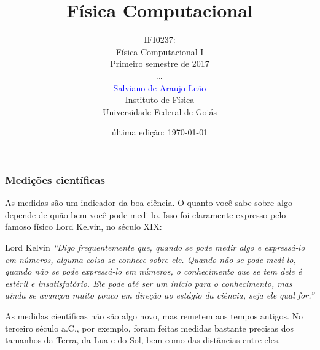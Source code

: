 \documentclass[xcolor=dvipsnames,compress,aspectratio=169,10pt]{beamer}
\title
  [Física Computacional]
  {Física Computacional}
\author[Salviano A. Leão]
{
    IFI0237:\\
    Física Computacional I\\
    Primeiro semestre de 2017\\ \vspace{1.0cm}
    \ldots\\
    \textcolor{blue}{Salviano de Araujo Leão}\\
    Instituto de Física\\
    Universidade Federal de Goiás
}
\date{última edição: \today}
\begin{document}
\frame{\titlepage}

\begin{frame}[fragile]\frametitle{Medições científicas}
As medidas são um indicador da boa ciência. O quanto você sabe sobre algo 
depende de quão bem você pode medi-lo. Isso foi claramente expresso pelo famoso
físico Lord Kelvin, no século XIX: 
\begin{center}
\begin{Caixaft}[colback=yellow!70]{Lord Kelvin}
\emph{``Digo frequentemente que, quando se pode medir algo e expressá-lo 
em números, alguma coisa se conhece sobre ele. Quando não se pode medi-lo, 
quando não se pode expressá-lo em números, o conhecimento que se tem dele 
é estéril e insatisfatório. Ele pode até ser um início para o conhecimento,
mas ainda se avançou muito pouco em direção ao estágio da ciência, seja ele 
qual for.''}\bigskip

\end{Caixaft}
\end{center}
As medidas científicas não são algo novo, mas remetem aos tempos antigos. No
terceiro século a.C., por exemplo, foram feitas medidas bastante precisas dos 
tamanhos da Terra, da Lua e do Sol, bem como das distâncias entre eles.
\end{frame}
\end{document}
